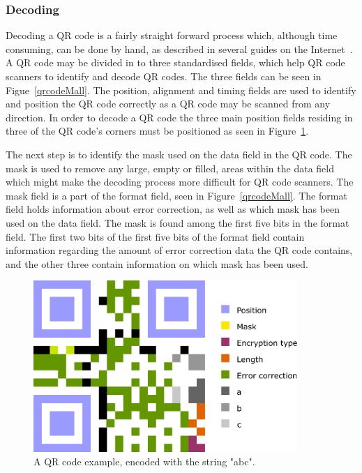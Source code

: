 \subsubsection{Decoding}
Decoding a QR code is a fairly straight forward process which, although time consuming, can be done by hand, as described in several guides on the Internet~\cite{qrcodeDecoding2, qrcodeDecoding, qrcodeDecoding3}. A QR code may be divided in to three standardised fields, which help QR code scanners to identify and decode QR codes. The three fields can be seen in Figue~\ref{qrcodeMall}. The position, alignment and timing fields are used to identify and position the QR code correctly as a QR code may be scanned from any direction. In order to decode a QR code the three main position fields residing in three of the QR code's corners must be positioned as seen in Figure~\ref{qrcodeExample}.

The next step is to identify the mask used on the data field in the QR code. The mask is used to remove any large, empty or filled, areas within the data field which might make the decoding process more difficult for QR code scanners. The mask field is a part of the format field, seen in Figure~\ref{qrcodeMall}. The format field holds information about error correction, as well as which mask has been used on the data field. The mask is found among the first five bits in the format field. The first two bits of the first five bits of the format field contain information regarding the amount of error correction data the QR code contains, and the other three contain information on which mask has been used.

	\begin{figure}[H]%
		\centering
		\includegraphics[width=100mm]{images/qrcodeexample}
		\caption{A QR code example, encoded with the string "abc".}
		\label{qrcodeExample}
	\end{figure}

